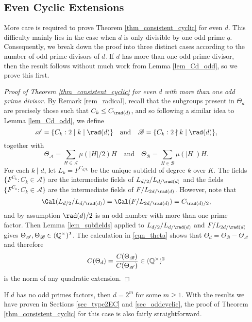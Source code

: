\subsection{Even Cyclic Extensions}
More care is required to prove Theorem \ref{thm_consistent_cyclic} for even $d$. This difficulty mainly lies in the case when $d$ is only divisible by one odd prime $q$. Consequently, we break down the proof into three distinct cases according to the number of odd prime divisors of $d$. If $d$ has more than one odd prime divisor, then the result follows without much work from Lemma \ref{lem_Cd_odd}, so we prove this first.

\begin{proof}[Proof of Theorem \ref{thm_consistent_cyclic} for even $d$ with more than one odd prime divisor]
    By Remark \ref{rem_radical}, recall that the subgroups present in $\Theta_d$ are precisely those such that $C_k\leq C_{\rad(d)}$, and so following a similar idea to Lemma \ref{lem_Cd_odd}, we define
    $$\mathcal{A}=\{C_k :2\mid k\mid\rad(d)\}\quad\text{and}\quad\mathcal{B}=\{C_k:2\nmid k\mid\rad(d)\},$$
    together with
    $$\Theta_\mathcal{A}=\sum_{H\in\mathcal{A}}\mu(|H|/2)H\quad\text{and}\quad\Theta_\mathcal{B}=\sum_{H\in\mathcal{B}}\mu(|H|)H. $$ 
    For each $k\mid d$, let $L_k=F^{C_{d/k}}$ be the unique subfield of degree $k$ over $K$. The fields $\{F^{C_k}:C_k\in\mathcal{A}\}$ are the intermediate fields of $L_{d/2}/L_{d/\rad(d)}$ and the fields $\{F^{C_k}:C_k\in\mathcal{A}\}$ are the intermediate fields of $F/L_{2d/\rad(d)}$. However, note that 
    $$\Gal(L_{d/2}/L_{d/\rad(d)})=\Gal(F/L_{2d/\rad(d)})=C_{\rad(d)/2},$$
    and by assumption $\rad(d)/2$ is an odd number with more than one prime factor. Then Lemma \ref{lem_subfields} applied to $L_{d/2}/L_{d/\rad(d)}$ and $F/L_{2d/\rad(d)}$ gives $\Theta_\mathcal{A},\Theta_\mathcal{B}\in(\mathbb{Q}^{\times})^2$. The calculation in \eqref{eqn_theta} shows that $\Theta_d=\Theta_\mathcal{B}-\Theta_\mathcal{A}$ and therefore 
    $$C(\Theta_d)=\frac{C(\Theta_\mathcal{B})}{C(\Theta_\mathcal{A})}\in(\mathbb{Q}^{\times})^2$$
    is the norm of any quadratic extension.
\end{proof}

If $d$ has no odd primes factors, then $d=2^m$ for some $m\geq1$. With the results we have proven in Sections \ref{sec_type2EC} and \ref{sec_oddcyclic}, the proof of Theorem \ref{thm_consistent_cyclic} for this case is also fairly straightforward.

